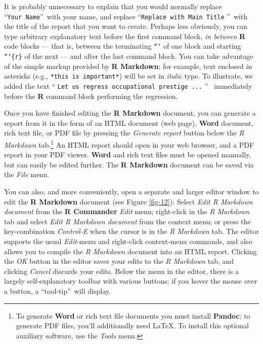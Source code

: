 \documentclass{article}%
\begin{document}
\noindent It is probably unnecessary to explain that you would normally
replace \textquotedblleft\texttt{Your\ Name}\textquotedblright\ with your
name, and replace \textquotedblleft\texttt{Replace\ with\ Main\ Title}%
\textquotedblright\ with the title of the report that you want to create.
Perhaps less obviously, you can type arbitrary explanatory text before the
first command block, \emph{in between} \textbf{R} code blocks --- that is,
between the terminating \texttt{```} of one block and starting \texttt{```\{r\}}
of the next --- and after the last command block. You can take advantage of
the simple markup provided by \textbf{R Markdown}; for example, text enclosed
in asterisks (e.g., \texttt{*this is important*}) will be set in
\textit{italic} type. To illustrate, we added the text \textquotedblleft%
\texttt{Let us regress occupational prestige ...} \textquotedblright%
\ immediately before the \textbf{R} command block performing the regression.

Once you have finished editing the \textbf{R Markdown} document, you can
generate a report from it in the form of an HTML document (web page), \textbf{Word} document,
rich text file,
or PDF file by pressing the \emph{Generate report}
button below the \emph{R Markdown} tab.\footnote{To generate \textbf{Word} or rich text file documents you must
install \textbf{Pandoc}; to generate PDF files, you'll additionally
need \LaTeX. To install this optional auxiliary software, use the \emph{Tools} menu.}
An HTML report should open in your web browser, and a PDF report in your PDF viewer.
\textbf{Word} and rich text files must be opened manually, but can easily be edited further.
The \textbf{R Markdown} document can be saved via the \emph{File} menu.

You can also, and more conveniently, open a separate and larger editor window to edit the \textbf{R
Markdown} document (see Figure \ref{fig-12}): Select \emph{Edit R Markdown
document} from the \textbf{R Commander} \emph{Edit} menu; right-click in the
\emph{R Markdown} tab and select \emph{Edit R Markdown document} from the
context menu; or press the key-combination \emph{Control-E} when the cursor is
in the \emph{R Markdown} tab. The editor supports the usual \emph{Edit}-menu
and right-click context-menu commands, and also allows you to compile the
\emph{R Markdown} document into an HTML report. Clicking the \emph{OK} button
in the editor saves your edits to the \emph{R Markdown} tab, and clicking
\emph{Cancel} discards your edits. Below the menu in the editor, there is a
largely self-explanatory toolbar with various buttons; if you hover the mouse
over a button, a \textquotedblleft tool-tip\textquotedblright\ will display.%
\end{document}
